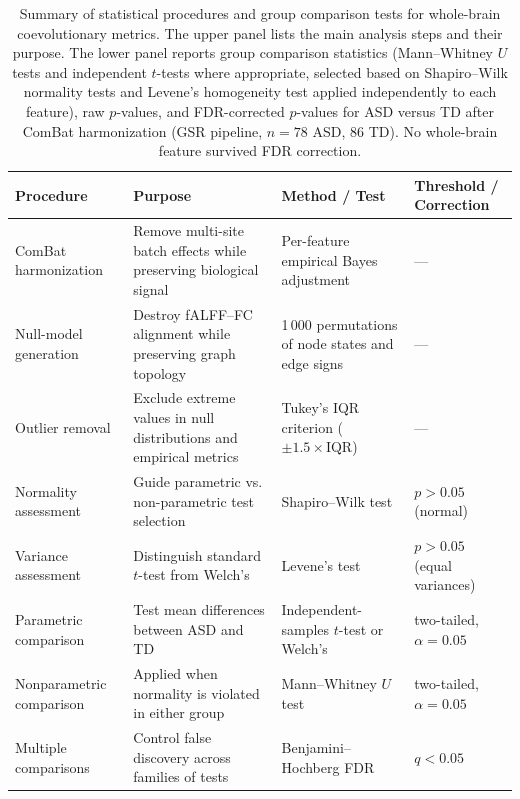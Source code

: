 \documentclass[10pt,letterpaper]{article}
\begin{document}
\begin{table}[ht]
\centering
\caption{Summary of statistical procedures and group comparison tests for whole-brain coevolutionary
metrics. The upper panel lists the main analysis steps and their purpose. The lower panel reports
group comparison statistics (Mann--Whitney $U$ tests and independent $t$-tests where appropriate,
selected based on Shapiro--Wilk normality tests and Levene's homogeneity test applied
independently to each feature), raw $p$-values, and FDR-corrected $p$-values for ASD versus TD
after ComBat harmonization (GSR pipeline, $n = 78$ ASD, $86$ TD). No whole-brain feature survived
FDR correction.}
\label{tab:assumptions_and_tests}
\small
\setlength{\tabcolsep}{3pt}
\begin{tabular}{p{}p{}p{}p{}}
\toprule
Procedure & Purpose & Method / Test & Threshold / Correction \\
\midrule
ComBat harmonization  & Remove multi-site batch effects while preserving biological signal & Per-feature empirical Bayes adjustment & --- \\
Null-model generation     & Destroy fALFF--FC alignment while preserving graph topology & 1\,000 permutations of node states and edge signs & --- \\
Outlier removal           & Exclude extreme values in null distributions and empirical metrics & Tukey's IQR criterion ($\pm 1.5\times\mathrm{IQR}$) & --- \\
Normality assessment      & Guide parametric vs. non-parametric test selection & Shapiro--Wilk test & $p > 0.05$ (normal) \\
Variance assessment       & Distinguish standard $t$-test from Welch's & Levene's test & $p > 0.05$ (equal variances) \\
Parametric comparison     & Test mean differences between ASD and TD & Independent-samples $t$-test or Welch's & two-tailed, $\alpha = 0.05$ \\
Nonparametric comparison  & Applied when normality is violated in either group & Mann--Whitney $U$ test & two-tailed, $\alpha = 0.05$ \\
Multiple comparisons      & Control false discovery across families of tests & Benjamini--Hochberg FDR & $q < 0.05$ \\
\bottomrule
\end{tabular}

\vspace{0.8em}


\end{table}
\end{document}
